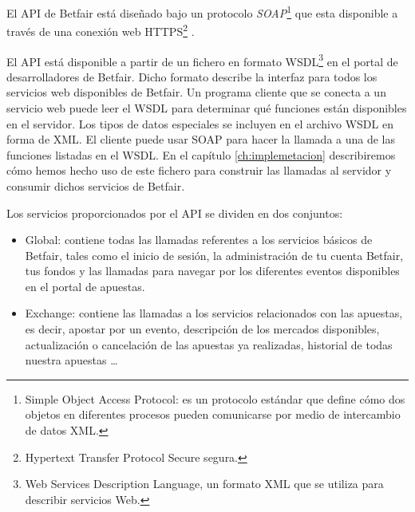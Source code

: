 	El API de Betfair está diseñado bajo un protocolo \emph{SOAP}\footnote{Simple Object Access Protocol: es un protocolo estándar que define cómo dos objetos en diferentes procesos pueden comunicarse por medio de intercambio de datos XML.} %
	 que esta disponible a través de una conexión web HTTPS\footnote{Hypertext Transfer Protocol Secure segura.} .  


          El API está disponible a partir de un fichero en formato WSDL\footnote{Web Services Description Language, un formato XML que se utiliza para describir servicios Web.} en el portal de desarrolladores de Betfair. Dicho formato describe la interfaz para todos los servicios web disponibles de Betfair. Un programa cliente que se conecta a un servicio web puede leer el WSDL para determinar qué funciones están disponibles en el servidor. Los tipos de datos especiales se incluyen en el archivo WSDL en forma de XML. El cliente puede usar SOAP para hacer la llamada a una de las funciones listadas en el WSDL. En el capítulo \ref{ch:implemetacion} describiremos cómo hemos hecho uso de este fichero para construir las llamadas al servidor y consumir dichos servicios de Betfair.
          
 Los servicios proporcionados por el API se dividen en dos conjuntos: 
          
\begin{itemize}
	\item Global: contiene todas las llamadas referentes a los servicios básicos de Betfair, tales como el inicio de sesión, la administración de tu cuenta Betfair, tus fondos y las llamadas para navegar por los diferentes eventos disponibles en el portal de apuestas.
	\item Exchange: contiene las llamadas a los servicios relacionados con las apuestas, es decir, apostar por un evento, descripción de los mercados disponibles, actualización o cancelación de las apuestas ya realizadas, historial de todas nuestra apuestas \ldots %
\end{itemize}

